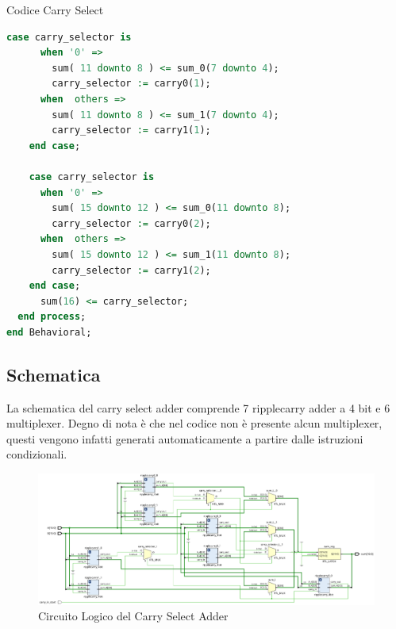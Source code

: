 \begin{problem}{Codice Carry Select}{}
\begin{lstlisting}[language=VHDL]
    case carry_selector is
      when '0' =>
        sum( 11 downto 8 ) <= sum_0(7 downto 4);
        carry_selector := carry0(1);
      when  others =>
        sum( 11 downto 8 ) <= sum_1(7 downto 4);
        carry_selector := carry1(1);
    end case;

    case carry_selector is
      when '0' =>
        sum( 15 downto 12 ) <= sum_0(11 downto 8);
        carry_selector := carry0(2);
      when  others =>
        sum( 15 downto 12 ) <= sum_1(11 downto 8);
        carry_selector := carry1(2);
    end case;
      sum(16) <= carry_selector;
  end process;
end Behavioral;
\end{lstlisting}
\end{problem}
\subsection{Schematica}
La schematica del carry select adder comprende 7 ripplecarry adder a 4 bit e 6 multiplexer.
Degno di nota è che nel codice non è presente alcun multiplexer, questi vengono infatti generati automaticamente a partire dalle istruzioni condizionali.
\begin{figure}[H]
    \centering
    \includegraphics[width=15cm]{resources/Carry_select_schematics.png}
    \caption{Circuito Logico del Carry Select Adder}
    \label{fig:logic_circuit_carry_select_adder}
\end{figure}

